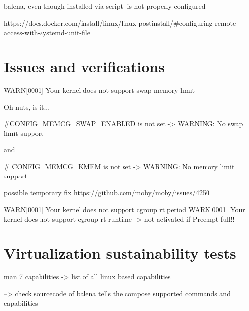 \documentclass[]{scrartcl}
\begin{document}
balena, even though installed via script, is not properly configured

https://docs.docker.com/install/linux/linux-postinstall/#configuring-remote-access-with-systemd-unit-file


\section{Issues and verifications}

WARN[0001] Your kernel does not support swap memory limit 

Oh nuts, is it...

#CONFIG_MEMCG_SWAP_ENABLED is not set -> WARNING: No swap limit support

and

# CONFIG_MEMCG_KMEM is not set -> WARNING: No memory limit support

possible temporary fix https://github.com/moby/moby/issues/4250



WARN[0001] Your kernel does not support cgroup rt period 
WARN[0001] Your kernel does not support cgroup rt runtime 
-> not activated if Preempt full!!

\section{Virtualization sustainability tests}



man 7 capabilities  -> list of all linux based capabilities


--> check sourcecode of balena tells the compose supported commands and capabilities
\end{document}
